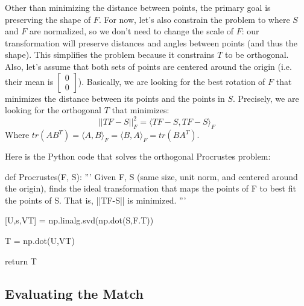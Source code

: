 \documentclass[paper=a4, fontsize=11pt]{scrartcl} %
\begin{document}
Other than minimizing the distance between points, the primary goal is preserving the shape of $F$. For now, let's also constrain the problem to where $S$ and $F$ are normalized, so we don't need to change the scale of $F$: our transformation will preserve distances and angles between points (and thus the shape). This simplifies the problem because it constrains $T$ to be orthogonal. Also, let's assume that both sets of points are centered around the origin (i.e. their mean is $\begin{bmatrix}
0\\
0
\end{bmatrix}$). Basically, we are looking for the best rotation of $F$ that minimizes the distance between its points and the points in $S$. Precisely, we are looking for the orthogonal $T$ that minimizes: 
$$||TF-S||^2_F = \langle TF-S, TF-S\rangle_F$$
Where $tr(AB^T) = \langle A,B\rangle_F = \langle B,A\rangle_F = tr(BA^T)$.


Here is the Python code that solves the orthogonal Procrustes problem:

\begin{python}
def Procrustes(F, S):
	'''
	Given F, S (same size, unit norm, and centered around the origin), finds the
	ideal transformation that maps the points of F to best fit the points of S.
	That is, ||TF-S|| is minimized.
	'''
	
	[U,s,VT] = np.linalg.svd(np.dot(S,F.T))
	
	T = np.dot(U,VT)
	
	return T
\end{python}


\subsection{Evaluating the Match}
\end{document}

